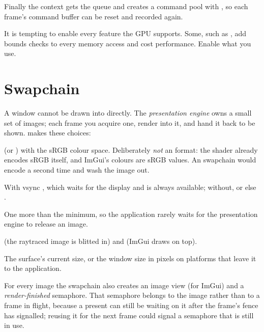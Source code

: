 \documentclass[11pt,a4paper]{article}
\begin{document}
Finally the context gets the queue and creates a command pool with , so each frame's command buffer can be reset and recorded again.

\begin{pitfall}
It is tempting to enable every feature the GPU supports. Some, such as , add bounds checks to every memory access and cost performance. Enable what you use.
\end{pitfall}

\section{Swapchain}

A window cannot be drawn into directly. The \emph{presentation engine} owns a small set of images; each frame you acquire one, render into it, and hand it back to be shown.  makes these choices:

\begin{description}[font=\sffamily\bfseries, leftmargin=0pt]
  \item[Format]  (or ) with the sRGB colour space. Deliberately \emph{not} an  format: the shader already encodes sRGB itself, and ImGui's colours are sRGB values. An  swapchain would encode a second time and wash the image out.
  \item[Present mode] With vsync , which waits for the display and is always available; without,  or else .
  \item[Image count] One more than the minimum, so the application rarely waits for the presentation engine to release an image.
  \item[Usage]  (the raytraced image is blitted in) and  (ImGui draws on top).
  \item[Extent] The surface's current size, or the window size in pixels on platforms that leave it to the application.
\end{description}

For every image the swapchain also creates an image view (for ImGui) and a \emph{render-finished} semaphore. That semaphore belongs to the image rather than to a frame in flight, because a present can still be waiting on it after the frame's fence has signalled; reusing it for the next frame could signal a semaphore that is still in use.
\end{document}
